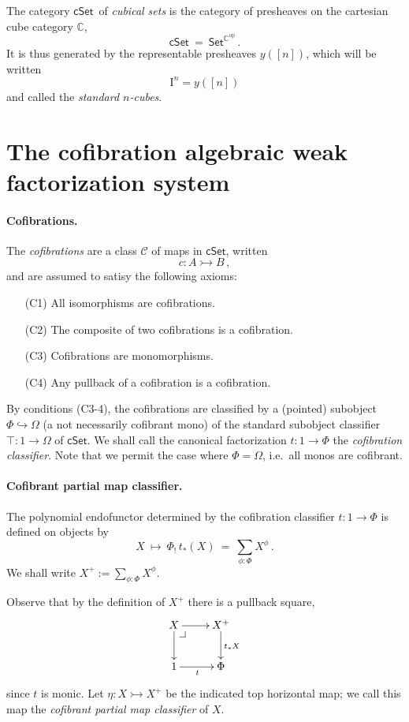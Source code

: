 \documentclass[11pt]{article}
\makeatletter
\newcommand{\C}{\ensuremath{\mathbb{C}}}
\newcommand{\psh}[1]{\ensuremath{\mathsf{Set}^{#1^{\mathrm{op}}}}}
\newcommand{\cSet}{\ensuremath{\mathsf{cSet}}}
\newcommand{\pbcorner}[1][dr]{\save*!/#1-1.2pc/#1:(-1,1)@^{|-}\restore}
\newcommand{\hook}{\ensuremath{\hookrightarrow}}
\newcommand{\mono}{\ensuremath{\rightarrowtail}}
\newcommand{\I}{\ensuremath{\mathrm{I}}}
\theoremstyle{remark}
\theoremstyle{definition}
\makeatother
\begin{document}
The category \cSet\ of \emph{cubical sets} is the category of presheaves on the cartesian cube category $\C$,
\[
\mathsf{cSet}\ =\ \psh{\C}\,.
\]
It is thus generated by the representable presheaves $y([n])$, which will be written $$\I^n = y([n])$$
and called the \emph{standard $n$-cubes}.  

\section{The cofibration algebraic weak factorization system}

\paragraph{Cofibrations.}
The \emph{cofibrations} are a class $\mathcal{C}$ of maps in $\mathsf{cSet}$, written $$c : A \mono B\,,$$  
and are assumed to satisy the following axioms:
\begin{enumerate}
\item[(C1)] All isomorphisms are cofibrations.
\item[(C2)] The composite of two cofibrations is a cofibration.
\item[(C3)] Cofibrations are monomorphisms.
\item[(C4)] Any pullback of a cofibration is a cofibration.
\end{enumerate}

By conditions (C3-4), the cofibrations are classified by a (pointed) subobject $\Phi \hook \Omega$ (a not necessarily cofibrant mono) of the standard subobject classifier $\top : 1 \to \Omega$ of $\mathsf{cSet}$. We shall call the canonical factorization $t : 1 \to \Phi$ the \emph{cofibration classifier}.  Note that we permit the case where $\Phi = \Omega$, i.e.\ all monos are cofibrant.

\paragraph{Cofibrant partial map classifier.}
The polynomial endofunctor \cite{GG} determined by the cofibration classifier $t : 1 \to \Phi$ is defined on objects by
\[
X\ \mapsto\ \Phi_!\,t_*(X)\ =\ \sum_{\phi: \Phi}X^{\phi}\,.
\]
We shall write $X^+ := \sum_{\phi: \Phi}X^{\phi}$.

Observe that by the definition of $X^+$ there is a pullback square,
\[
\xymatrix{
X \ar[d]\pbcorner \ar[r] & X^+ \ar[d]^{t_*X}\\
1 \ar[r]_{t} & \Phi
}
\]
since $t$ is monic. Let $\eta : X\mono X^+$ be the indicated top horizontal map; we call this map the \emph{cofibrant partial map classifier} of $X$.
 
\end{document}
